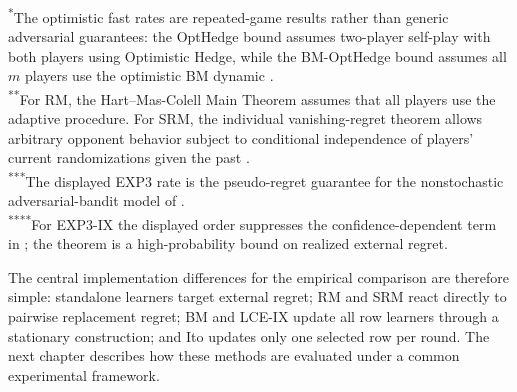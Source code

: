 \begin{table}[htbp]
    \vspace{0.5em}
    \begin{minipage}{0.97\textwidth}
        \footnotesize
        \textsuperscript{*}The optimistic fast rates are repeated-game results rather than generic adversarial guarantees: the OptHedge bound assumes two-player self-play with both players using Optimistic Hedge, while the BM-OptHedge bound assumes all $m$ players use the optimistic BM dynamic \citep{chen_hedging_2020}.\\
        \textsuperscript{**}For RM, the Hart--Mas-Colell Main Theorem assumes that all players use the adaptive procedure. For SRM, the individual vanishing-regret theorem allows arbitrary opponent behavior subject to conditional independence of players' current randomizations given the past \citep{hart_simple_2000}.\\
        \textsuperscript{***}The displayed EXP3 rate is the pseudo-regret guarantee for the nonstochastic adversarial-bandit model of \citet{auer_nonstochastic_2002}.\\
        \textsuperscript{****}For EXP3-IX the displayed order suppresses the confidence-dependent term in \citet{neu_explore_2015}; the theorem is a high-probability bound on realized external regret.
    \end{minipage}
\end{table}

The central implementation differences for the empirical comparison are
therefore simple: standalone learners target external regret; RM and SRM react
directly to pairwise replacement regret; BM and LCE-IX update all row learners
through a stationary construction; and Ito updates only one selected row per
round. The next chapter describes how these methods are evaluated under a
common experimental framework.
